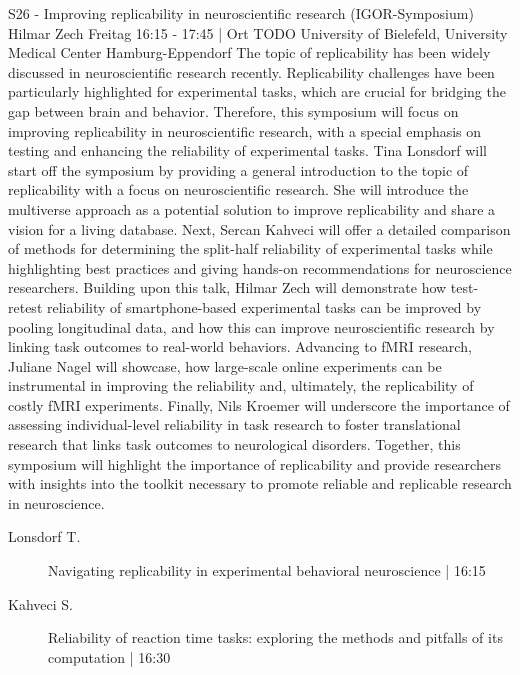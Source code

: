
            \begin{symposium}
            {S26 - Improving replicability in neuroscientific research (IGOR-Symposium)}
            {Hilmar Zech}
            {Freitag 16:15 - 17:45 | Ort TODO}
            {University of Bielefeld, University Medical Center Hamburg-Eppendorf}
            The topic of replicability has been widely discussed in neuroscientific research recently. Replicability challenges have been particularly highlighted for experimental tasks, which are crucial for bridging the gap between brain and behavior. Therefore, this symposium will focus on improving replicability in neuroscientific research, with a special emphasis on testing and enhancing the reliability of experimental tasks. Tina Lonsdorf will start off the symposium by providing a general introduction to the topic of replicability with a focus on neuroscientific research. She will introduce the multiverse approach as a potential solution to improve replicability and share a vision for a living database. Next, Sercan Kahveci will offer a detailed comparison of methods for determining the split-half reliability of experimental tasks while highlighting best practices and giving hands-on recommendations for neuroscience researchers. Building upon this talk, Hilmar Zech will demonstrate how test-retest reliability of smartphone-based experimental tasks can be improved by pooling longitudinal data, and how this can improve neuroscientific research by linking task outcomes to real-world behaviors. Advancing to fMRI research, Juliane Nagel will showcase, how large-scale online experiments can be instrumental in improving the reliability and, ultimately, the replicability of costly fMRI experiments. Finally, Nils Kroemer will underscore the importance of assessing individual-level reliability in task research to foster translational research that links task outcomes to neurological disorders. Together, this symposium will highlight the importance of replicability and provide researchers with insights into the toolkit necessary to promote reliable and replicable research in neuroscience.
            \begin{description}    
            
                \item [ Lonsdorf T.] Navigating replicability in experimental behavioral neuroscience \textcolor{mygray}{ | 16:15}    
                
                \item [ Kahveci S.] Reliability of reaction time tasks: exploring the methods and pitfalls of its computation \textcolor{mygray}{ | 16:30}    
                

\end{description}
\end{symposium}
